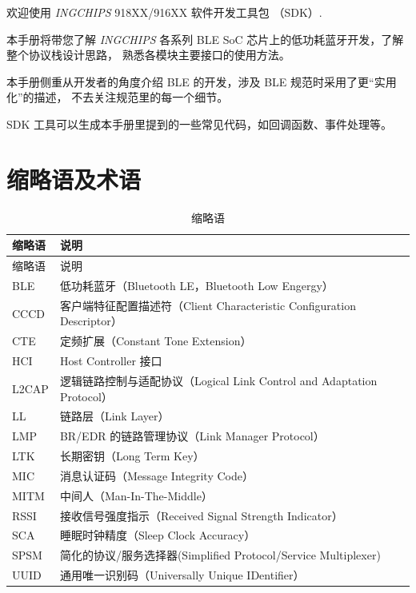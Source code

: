 \documentclass[
  12pt,
]{book}
\begin{document}
欢迎使用 \emph{INGCHIPS} 918XX/916XX 软件开发工具包 （SDK）.

本手册将带您了解 \emph{INGCHIPS} 各系列 BLE SoC 芯片上的低功耗蓝牙开发，了解整个协议栈设计思路，
熟悉各模块主要接口的使用方法。

本手册侧重从开发者的角度介绍 BLE 的开发，涉及 BLE 规范时采用了更``实用化''的描述，
不去关注规范里的每一个细节。

SDK 工具可以生成本手册里提到的一些常见代码，如回调函数、事件处理等。

\hypertarget{ux7f29ux7565ux8bedux53caux672fux8bed}{%
\section{缩略语及术语}\label{ux7f29ux7565ux8bedux53caux672fux8bed}}

\begin{longtable}[]{@{}ll@{}}
\caption{\label{tab:ch0-abbreviations} 缩略语}\tabularnewline
\toprule()
缩略语 & 说明 \\
\midrule()
\endfirsthead
\toprule()
缩略语 & 说明 \\
\midrule()
\endhead
BLE & 低功耗蓝牙（Bluetooth LE，Bluetooth Low Engergy） \\
CCCD & 客户端特征配置描述符（Client Characteristic Configuration Descriptor） \\
CTE & 定频扩展（Constant Tone Extension） \\
HCI & Host Controller 接口 \\
L2CAP & 逻辑链路控制与适配协议（Logical Link Control and Adaptation Protocol） \\
LL & 链路层（Link Layer） \\
LMP & BR/EDR 的链路管理协议（Link Manager Protocol） \\
LTK & 长期密钥（Long Term Key） \\
MIC & 消息认证码（Message Integrity Code） \\
MITM & 中间人（Man-In-The-Middle） \\
RSSI & 接收信号强度指示（Received Signal Strength Indicator） \\
SCA & 睡眠时钟精度（Sleep Clock Accuracy） \\
SPSM & 简化的协议/服务选择器(Simplified Protocol/Service Multiplexer) \\
UUID & 通用唯一识别码（Universally Unique IDentifier） \\
\bottomrule()
\end{longtable}
\end{document}

